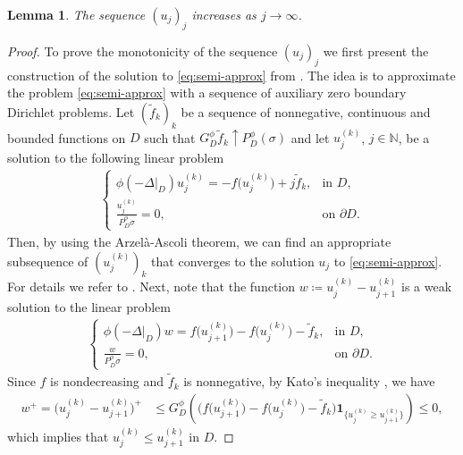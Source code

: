 \documentclass[12pt,a4paper,onecolumn]{amsart}
\newtheorem{lem}[thm]{Lemma}
\theoremstyle{definition}
\newcommand{\N}{\mathbb{N}}
\newcommand{\1}{\mathbf 1}
\newcommand{\Lo}{\phi(-\left.\Delta\right\vert_{D})}
\newcommand{\GDfi}{G^\phi_{ D}}
\newcommand{\GDFI}{\GDfi}
\newcommand{\PDfi}{P^\phi_{ D}}
\newcommand{\PDFI}{\PDfi}
\newcommand{\wt}{\widetilde}
\numberwithin{equation}{section}
\begin{document}
\begin{lem}\label{l:approx incre}
	The sequence $(u_j)_j$ increases as $j\to\infty$.
\end{lem}
\begin{proof}
	To prove the monotonicity of the sequence $(u_j)_j$ we first present the construction of the solution to \eqref{eq:semi-approx} from \cite[Theorem 5.10]{Bio23}. The idea is to approximate the problem \eqref{eq:semi-approx} with a sequence of auxiliary zero boundary Dirichlet problems. Let $(\wt f_k)_k$ be a sequence of nonnegative, continuous and bounded functions on $D$ such that $\GDFI\wt f_k\uparrow \PDFI (\sigma)$ and let $u_j^{(k)}$, $j\in\N$, be a solution to the following linear problem
	\begin{align}\label{eq:semi non-positive fk approx}
		\begin{cases}
			\Lo u_j^{(k)}=-f\big(u_j^{(k)}\big)+j\wt f_k,&\textrm{in $D$},\\
			\frac{u_j^{(k)}}{\PDFI\sigma}=0,&\textrm{on $\partial D$}.
		\end{cases}
	\end{align}
	Then, by using the Arzel\`{a}-Ascoli theorem, we can find an appropriate subsequence of $(u_j^{(k)})_k$ that converges to the solution $u_j$ to \eqref{eq:semi-approx}. For details we refer to \cite[Theorem 5.10]{Bio23}. Next, note that the function $w\coloneqq u_{j}^{(k)}-u_{j+1}^{(k)}$ is a weak solution to the linear problem
	\begin{align*}
		\begin{cases}
			\Lo w=f\big(u_{j+1}^{(k)}\big)-f\big(u_{j}^{(k)}\big)-\wt f_k,&\textrm{in $D$},\\
			\frac{w}{\PDFI\sigma}=0,&\textrm{on $\partial D$}.
		\end{cases}
	\end{align*}
	Since $f$ is nondecreasing and $\wt f_k$ is nonnegative, by Kato's inequality \cite[Proposition 5.4]{Bio23}, we have
	\begin{align*}
		w^+=\big(u_{j}^{(k)}-u_{j+1}^{(k)}\big)^+&\le \GDFI\left(\big(f\big(u_{j+1}^{(k)}\big)-f\big(u_{j}^{(k)}\big)-\wt f_k\big)\1_{\{u_{j}^{(k)}\ge u_{j+1}^{(k)}\}}\right)\le 0,
	\end{align*}
	which implies that $u_{j}^{(k)}\le u_{j+1}^{(k)}$ in $D$.
	

\end{proof}
\end{document}
